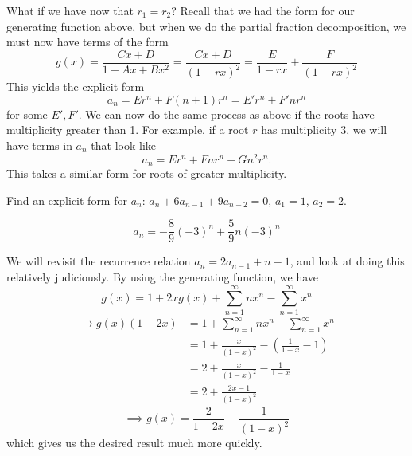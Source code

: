 \documentclass[11pt,twosided]{article}
\begin{document}
What if we have now that $r_1 = r_2$? Recall that we had the form for our generating function above, but when we do the partial fraction decomposition, we must now have terms of the form
\[
	g(x) = \frac{Cx+D}{1 + Ax + Bx^2} = \frac{Cx+D}{(1-rx)^2} =  \frac{E}{1-rx} + \frac{F}{(1-rx)^2}
\]
This yields the explicit form 
\[
	a_n = Er^n + F(n+1)r^n = E'r^n + F'nr^n
\]
for some $E', F'$. We can now do the same process as above if the roots have multiplicity greater than 1. For example, if a root $r$ has multiplicity 3, we will have terms in $a_n$ that look like 
\[
	a_n = Er^n + Fn r^n + Gn^2 r^n.
\]
This takes a similar form for roots of greater multiplicity. 
\begin{problem}{2}
	Find an explicit form for $a_n$: $a_n + 6a_{n-1} + 9a_{n-2} = 0$, $a_1 =1$, $a_2 = 2$. 
\end{problem}
\begin{solution}
\[
	a_n = -\frac{8}{9}(-3)^n + \frac{5}{9}n(-3)^n 
\]
\end{solution}

We will revisit the recurrence relation $a_n = 2a_{n-1} + n - 1$, and look at doing this relatively judiciously. By using the generating function, we have
\[
	g(x) = 1 + 2xg(x) + \sum_{n=1}^\infty nx^n - \sum_{n=1}^\infty x^n 
\]
\begin{align*}
	\rightarrow g(x)(1-2x) &= 1 + \sum_{n=1}^\infty nx^n - \sum_{n=1}^\infty x^n \\
	&= 1 + \frac{x}{(1-x)^2} - \left( \frac{1}{1-x} - 1 \right) \\
	&= 2 + \frac{x}{(1-x)^2} - \frac{1}{1-x} \\
	&= 2 + \frac{2x-1}{(1-x)^2}
\end{align*}
\[
	\implies g(x) = \frac{2}{1-2x} - \frac{1}{(1-x)^2}
\]
which gives us the desired result much more quickly. 
\end{document}
